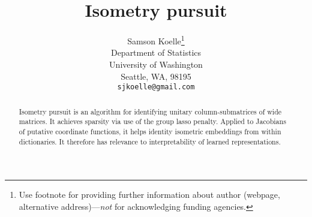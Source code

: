 \documentclass{article}
\title{Isometry pursuit}
\author{%
  Samson Koelle\thanks{Use footnote for providing further information
    about author (webpage, alternative address)---\emph{not} for acknowledging
    funding agencies.} \\
  Department of Statistics\\
  University of Washington\\
  Seattle, WA, 98195  \\
  \texttt{sjkoelle@gmail.com} \\
}
\begin{document}
\maketitle

\begin{abstract}
Isometry pursuit is an algorithm for identifying unitary column-submatrices of wide matrices.
It achieves sparsity via use of the group lasso penalty.
Applied to Jacobians of putative coordinate functions, it helps identity isometric embeddings from within dictionaries.
It therefore has relevance to interpretability of learned representations.
\end{abstract}





\end{document}
